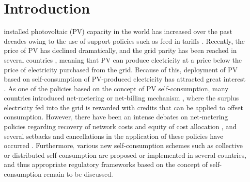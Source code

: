 \documentclass[lettersize,journal]{IEEEtran}
\begin{document}
\section{Introduction}

%
 installed photovoltaic (PV) capacity in the world has  increased over the past decades owing to the use of support policies such as  feed-in tariffs \cite{timilsina12,poruschi18}.
Recently, the price of PV has declined dramatically, and the grid parity has been reached in several countries \cite{iea-pvps22}, meaning that PV can produce electricity at a price below the price of electricity purchased from the grid. 
Because of this, %
deployment of PV based on self-consumption of PV-produced electricity has attracted great interest \cite{luthander15}. 
%
As one of the policies based on the concept of PV self-consumption,
many countries introduced net-metering or net-billing mechanism \cite{ordonez22}, where the surplus electricity fed into the grid is rewarded with credits that can be applied to offset consumption.
However, there have been an intense debates on net‑metering policies regarding  recovery of network costs and equity of cost allocation \cite{felder14,schittekatte18}, and several setbacks and cancellations in the application of these policies have occurred \cite{iea-pvps22}. 
Furthermore, various new self-consumption schemes such as collective or distributed self‑consumption \cite{ines20,dadamo22} are proposed or implemented %
in several countries,  %
and thus appropriate regulatory frameworks based on the concept of self-consumption remain to be discussed.  
\end{document}
